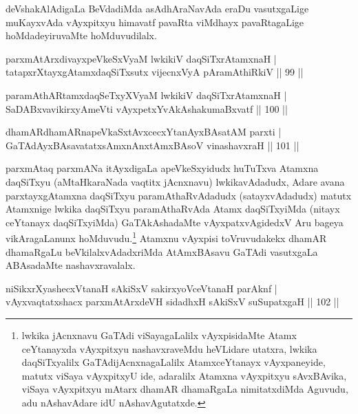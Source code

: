 \begin{artha}
deVshakAlAdigaLa BeVdadiMda asAdhAraNavAda eraDu vasutxgaLige muKayxvAda vAyxpitxyu himavatf pavaRta viMdhayx pavaRtagaLige hoMdadeyiruvaMte hoMduvudilalx.
\end{artha}

\begin{shl}
parxmAtArxdivayxpeVkeSxVyaM lwkikiV daqSiTxrAtamxnaH |\\
tatapxrXtayxgAtamxdaqSiTxsutx vijecnxVyA pAramAthiRkiV \hfill || 99 ||
\end{shl}

\begin{shl}
paramAthARtamxdaqSeTxyXVyaM lwkikiV daqSiTxrAtamxnaH |\\
SaDABxvavikirxyAmeVti vAyxpetxYvA\s \s kAshakumaBxvatf \hfill || 100 ||
\end{shl}

\begin{shl}
dhamARdhamARnapeVkaSxtAvxcecxYtanAyxBAsatAM parxti |\\
GaTAdAyxBAsavatatxsAmxnAnx\s \s tAmxBAsoV vinashavxraH \hfill || 101 ||
\end{shl}

\begin{artha}%
parxmAtaq parxmANa itAyxdigaLa apeVkeSxyidudx huTuTxva Atamxna daqSiTxyu (aMtaHkaraNada vaqtitx jAcnxnavu) lwkikavAdadudx, Adare avana parxtayxgAtamxna daqSiTxyu paramAthaRvAdadudx (satayxvAdadudx) matutx Atamxnige lwkika daqSiTxyu paramAthaRvAda Atamx daqSiTxyiMda (nitayx ceYtanayx daqSiTxyiMda) GaTAkAshadaMte vAyxpatxvAgidedxV Aru bageya vikAragaLanunx hoMduvudu.\footnote[1]{lwkika jAcnxnavu GaTAdi viSayagaLalilx vAyxpisidaMte Atamx ceYtanayxda vAyxpitxyu nashavxraveMdu heVLidare utatxra, lwkika daqSiTxyalilx GaTAdijAcnxnagaLalilx AtamxceYtanayx vAyxpaneyide, matutx viSaya vAyxpitxyU ide, adaralilx Atamxna vAyxpitxyu sAvxBAvika, viSaya vAyxpitxyu mAtarx dhamAR dhamaRgaLa nimitatxdiMda Aguvudu, adu nAshavAdare idU nAshavAgutatxde.} Atamxnu vAyxpisi toVruvudakekx dhamAR dhamaRgaLu beVkilalxvAdadxriMda AtAmxBAsavu GaTAdi vasutxgaLa ABAsadaMte nashavxravalalx.
\end{artha}


\begin{shl}
niSikxrXyashecxVtanaH sAkiSxV sakirxyoV\s ceVtanaH parAknf |\\
vAyxvaqtatxshacx parxmAtArxdeVH sidadhxH sAkiSxV suSupatxgaH \hfill || 102 ||
\end{shl}

